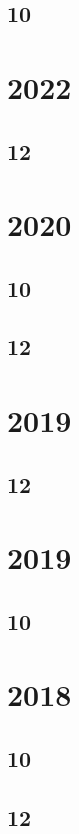 \documentclass[11pt]{book}
\begin{document}
\subsection{10}

\section{2022}
\subsection{12}

\section{2020}
\subsection{10}

\subsection{12}

\section{2019}
\subsection{12}





\section{2019}
\subsection{10}

\section{2018}
\subsection{10}


\subsection{12}



\end{document}
